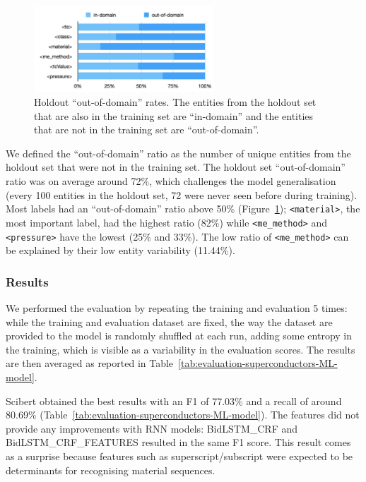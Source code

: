 \begin{figure}[ht]
    \centering
    \includegraphics[width=0.6\textwidth]{figures/automatic_extraction_supercon/superconductor-out-domain-holdout-unique}
    \caption{Holdout ``out-of-domain'' rates. The entities from the holdout set that are also in the training set are ``in-domain'' and the entities that are not in the training set are ``out-of-domain''.}
    \label{fig:out-domain-holdout}
\end{figure}

We defined the ``out-of-domain'' ratio as the number of unique entities from the holdout set that were not in the training set.
The holdout set ``out-of-domain'' ratio was on average around 72\%, which challenges the model generalisation (every 100 entities in the holdout set, 72 were never seen before during training).
Most labels had an ``out-of-domain'' ratio above 50\%  (Figure~\ref{fig:out-domain-holdout});  \texttt{<material>}, the most important label, had the highest ratio (82\%) while \texttt{<me\_method>} and \texttt{<pressure>} have the lowest (25\% and 33\%). 
The low ratio of \texttt{<me\_method>} can be explained by their low entity variability (11.44\%).

\subsubsection{Results}
We performed the evaluation by repeating the training and evaluation 5 times: while the training and evaluation dataset are fixed, the way the dataset are provided to the model is randomly shuffled at each run, adding some entropy in the training, which is visible as a variability in the evaluation scores.
The results are then averaged as reported in Table~\ref{tab:evaluation-superconductors-ML-model}.

Scibert obtained the best results with an F1 of 77.03\% and a recall of around 80.69\% (Table~\ref{tab:evaluation-superconductors-ML-model}).
The features did not provide any improvements with RNN models: BidLSTM\_CRF and BidLSTM\_CRF\_FEATURES resulted in the same F1 score.
This result comes as a surprise because features such as superscript/subscript were expected to be determinants for recognising material sequences.


